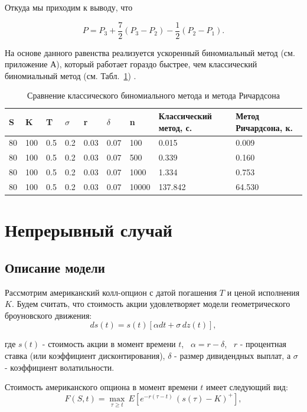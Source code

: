 \documentclass[oneside,final,12pt]{article}
\begin{document}
\bigskip
Откуда мы приходим к выводу, что

$$
P = P_3 + \frac{7}{2} (P_3 - P_2) - \frac{1}{2} (P_2 - P_1).
$$

На основе данного равенства реализуется ускоренный биномиальный метод (см. приложение А), который работает гораздо быстрее, чем классический биномиальный метод (см. Табл.~\ref{tab:Richardson}) \cite{hull}.


\begin{table}[h]
\caption{\label{tab:Richardson}Сравнение классического биномиального метода и метода Ричардсона}
\begin{tabular}{|l|l|l|l|l|l|l|l|l|}
\hline
S  & K   & T   & $\sigma$ & r    & $\delta$ & n     & Классический метод, с. & Метод Ричардсона, к. \\ \hline
80 & 100 & 0.5 & 0.2      & 0.03 & 0.07     & 100   & 0.015                    & 0.009                  \\ \hline
80 & 100 & 0.5 & 0.2      & 0.03 & 0.07     & 500   & 0.339                    & 0.160                  \\ \hline
80 & 100 & 0.5 & 0.2      & 0.03 & 0.07     & 1000  & 1.334                    & 0.753                  \\ \hline
80 & 100 & 0.5 & 0.2      & 0.03 & 0.07     & 10000 & 137.842                  & 64.530                 \\ \hline
\end{tabular}
\end{table}

\newpage
\section{Непрерывный случай}

\subsection{Описание модели}

Рассмотрим американский колл-опцион с датой погашения $T$ и ценой исполнения $K$. Будем считать, что стоимость акции удовлетворяет модели геометрического броуновского движения:
$$
ds(t) = s(t)[\alpha dt + \sigma \, dz(t)],
$$

\noindent
где $s(t)$ - стоимость акции в момент времени $t$, \, $\alpha = r-\delta$, \, $r$ - процентная ставка (или коэффициент дисконтирования), $\delta$ - размер дивидендных выплат, а $\sigma$ - коэффициент волатильности.

Стоимость американского опциона в момент времени $t$ имеет следующий вид:
$$
F(S,t)=\max_{\tau \geq t} \, E[e^{-r(\tau-t)} \, (s(\tau)-K)^+],
$$
\end{document}

